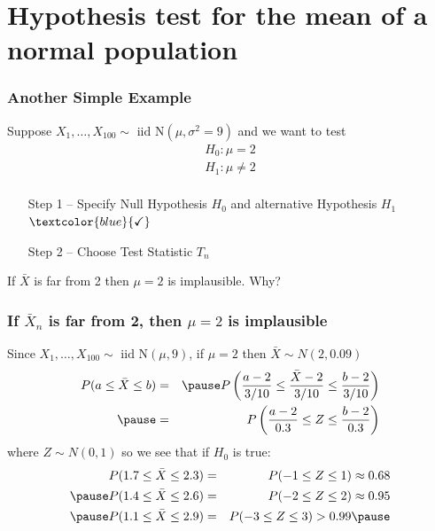\section{Hypothesis test for the mean of a normal population}
\begin{frame}
  \frametitle{Another Simple Example}
  
  Suppose $X_1, \dots, X_{100} \sim \mbox{ iid N}(\mu, \sigma^2 = 9)$ and we want to test
  \[
    \begin{array}{c}
      H_0\colon \mu = 2\\
      H_1\colon \mu \neq 2\\
    \end{array}
  \]

  \pause

  \begin{enumerate}
    \item[Step 1] -- Specify Null Hypothesis $H_0$ and alternative Hypothesis $H_1$ $\textcolor{blue}{\checkmark}$\pause
    \item[Step 2] -- Choose Test Statistic $T_n$ 
  \end{enumerate}

  \pause

  \alert{If $\bar{X}$ is far from 2 then $\mu=2$ is implausible. Why?}

\end{frame}
\begin{frame}
  \frametitle{If $\bar{X}_n$ is far from 2, then $\mu = 2$ is implausible}

  Since $X_1, \dots, X_{100} \sim \mbox{ iid N}(\mu, 9)$, \alert{if $\mu = 2$ then $\bar{X} \sim N(2, 0.09)$}
  \begin{eqnarray*}
     P(a \leq \bar{X} \leq b) &=& \pause P\left(\frac{a - 2}{3/10} \leq \frac{\bar{X}-2}{3/10} \leq \frac{b - 2}{3/10} \right)\\ \pause
     &=& P\left( \frac{a-2}{0.3} \leq Z \leq \frac{b-2}{0.3} \right)
  \end{eqnarray*}
  where $Z \sim N(0,1)$ so we see that if $H_0$ is true: \pause
  \begin{eqnarray*}
    P(1.7 \leq \bar{X} \leq 2.3) &=& P(-1 \leq Z \leq 1) \approx 0.68\\ \pause
    P(1.4 \leq \bar{X} \leq 2.6) &=& P(-2 \leq Z \leq 2) \approx 0.95 \\ \pause
    P(1.1 \leq \bar{X} \leq 2.9) &=& P(-3 \leq Z \leq 3) > 0.99 \pause
  \end{eqnarray*}

\end{frame}
